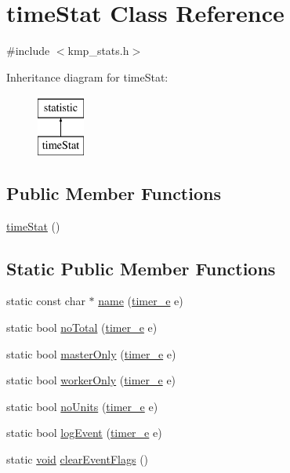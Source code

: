 \hypertarget{classtimeStat}{\section{time\-Stat Class Reference}
\label{classtimeStat}
}


{\ttfamily \#include $<$kmp\-\_\-stats.\-h$>$}

Inheritance diagram for time\-Stat\-:\begin{figure}[H]
\begin{center}
\leavevmode
\includegraphics[height=2.000000cm]{classtimeStat}
\end{center}
\end{figure}
\subsection*{Public Member Functions}
\begin{DoxyCompactItemize}
\item 
\hyperlink{classtimeStat_ad35b7334bdf79aa157d0a6d959353a47}{time\-Stat} ()
\end{DoxyCompactItemize}
\subsection*{Static Public Member Functions}
\begin{DoxyCompactItemize}
\item 
static const char $\ast$ \hyperlink{classtimeStat_a4e32a7a1f0685df9f75f837eead8b7be}{name} (\hyperlink{kmp__stats_8h_ae03f1e0ff609f86afa9b7167a12c6c06}{timer\-\_\-e} e)
\item 
static bool \hyperlink{classtimeStat_a3c545325fae636418538c3ab7cff2f18}{no\-Total} (\hyperlink{kmp__stats_8h_ae03f1e0ff609f86afa9b7167a12c6c06}{timer\-\_\-e} e)
\item 
static bool \hyperlink{classtimeStat_a062cb0effb2bca43a2d85accaf5cbe08}{master\-Only} (\hyperlink{kmp__stats_8h_ae03f1e0ff609f86afa9b7167a12c6c06}{timer\-\_\-e} e)
\item 
static bool \hyperlink{classtimeStat_a5a871113709bc14925c6d60f637e03b6}{worker\-Only} (\hyperlink{kmp__stats_8h_ae03f1e0ff609f86afa9b7167a12c6c06}{timer\-\_\-e} e)
\item 
static bool \hyperlink{classtimeStat_a5af620a2fff9ca3b1b758d106633e5b6}{no\-Units} (\hyperlink{kmp__stats_8h_ae03f1e0ff609f86afa9b7167a12c6c06}{timer\-\_\-e} e)
\item 
static bool \hyperlink{classtimeStat_ab45f55ba382e1ac2018ed6ab3612d3b1}{log\-Event} (\hyperlink{kmp__stats_8h_ae03f1e0ff609f86afa9b7167a12c6c06}{timer\-\_\-e} e)
\item 
static \hyperlink{ittnotify__static_8h_af941d56e55e3c5465135b60c4d6343ed}{void} \hyperlink{classtimeStat_a1ee4b834f58f4f104d3c1e0a3f253e9a}{clear\-Event\-Flags} ()
\end{DoxyCompactItemize}
